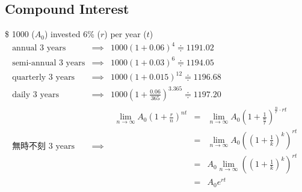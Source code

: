 \subsection*{Compound Interest}
\$ 1000 ($A_0$) invested 6\% ($r$) per year ($t$)
$$\begin{array}{rcl}
\text{annual 3 years} & \implies & 1000(1+0.06)^4 \Doteq 1191.02\\
\text{semi-annual 3 years} & \implies & 1000(1+0.03)^6 \Doteq 1194.05\\
\text{quarterly 3 years} & \implies & 1000(1+0.015)^{12} \Doteq 1196.68\\
\text{daily 3 years} & \implies & \displaystyle 1000(1+ \frac{0.06}{365})^{3.365} \Doteq 1197.20\\
\text{無時不刻 3 years} & \implies & 
\begin{array}{rcl}
\displaystyle \lim_{n \to \infty} A_0(1 + \frac{r}{n})^{nt} & = & \displaystyle \lim_{n \to \infty} A_0 (1+ \frac{1}{\frac{n}{r}})^{\frac{n}{r} \cdot rt}\\
& = & \displaystyle \lim_{n \to \infty} A_0((1+\frac{1}{k})^k)^{rt}\\
& = & \displaystyle A_0 \lim_{n \to \infty} ((1+\frac{1}{k})^k)^{rt} \\
& = & A_0 e^{rt}
\end{array}
\end{array}$$

